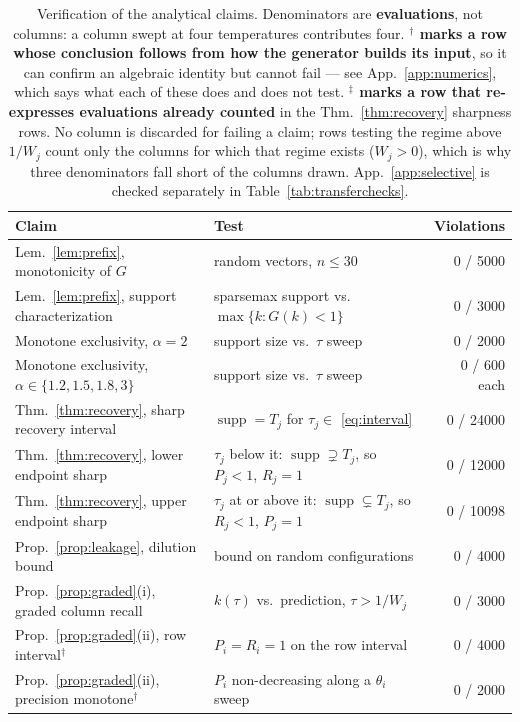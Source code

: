 \documentclass{article}
\newcommand{\supp}{\operatorname{supp}}
\begin{document}
\begin{table}[h]
\centering
\caption{Verification of the analytical claims. Denominators are \textbf{evaluations}, not
columns: a column swept at four temperatures contributes four. \textbf{$^{\dagger}$ marks a row
whose conclusion follows from how the generator builds its input}, so it can confirm an algebraic
identity but cannot fail --- see App.~\ref{app:numerics}, which says what each of these does and
does not test. \textbf{$^{\ddagger}$ marks a row that re-expresses evaluations already counted}
in the Thm.~\ref{thm:recovery} sharpness rows. No column is discarded for failing a claim; rows
testing the regime above $1/W_j$ count only the columns for which that regime exists ($W_j>0$),
which is why three denominators fall short of the columns drawn. App.~\ref{app:selective} is
checked separately in Table~\ref{tab:transferchecks}.}
\label{tab:verification}
\scriptsize
\setlength{\tabcolsep}{3.5pt}
\begin{tabular}{@{}llr@{}}
\toprule
\textbf{Claim} & \textbf{Test} & \textbf{Violations} \\
\midrule
Lem.~\ref{lem:prefix}, monotonicity of $G$ & random vectors, $n \leq 30$ & 0 / 5000 \\
Lem.~\ref{lem:prefix}, support characterization & sparsemax support vs.\ $\max\{k: G(k)<1\}$ & 0 / 3000 \\
Monotone exclusivity, $\alpha=2$ & support size vs.\ $\tau$ sweep & 0 / 2000 \\
Monotone exclusivity, $\alpha \in \{1.2,1.5,1.8,3\}$ & support size vs.\ $\tau$ sweep & 0 / 600 each \\
Thm.~\ref{thm:recovery}, sharp recovery interval & $\supp = T_j$ for $\tau_j \in$ \eqref{eq:interval} & 0 / 24000 \\
Thm.~\ref{thm:recovery}, lower endpoint sharp & $\tau_j$ below it: $\supp \supsetneq T_j$, so $P_j<1$, $R_j=1$ & 0 / 12000 \\
Thm.~\ref{thm:recovery}, upper endpoint sharp & $\tau_j$ at or above it: $\supp \subsetneq T_j$, so $R_j<1$, $P_j=1$ & 0 / 10098 \\
Prop.~\ref{prop:leakage}, dilution bound & bound on random configurations & 0 / 4000 \\
Prop.~\ref{prop:graded}(i), graded column recall & $k(\tau)$ vs.\ prediction, $\tau > 1/W_j$ & 0 / 3000 \\
Prop.~\ref{prop:graded}(ii), row interval$^{\dagger}$ & $P_i = R_i = 1$ on the row interval & 0 / 4000 \\
Prop.~\ref{prop:graded}(ii), precision monotone$^{\dagger}$ & $P_i$ non-decreasing along a $\theta_i$ sweep & 0 / 2000 \\

\end{tabular}
\end{table}
\end{document}
